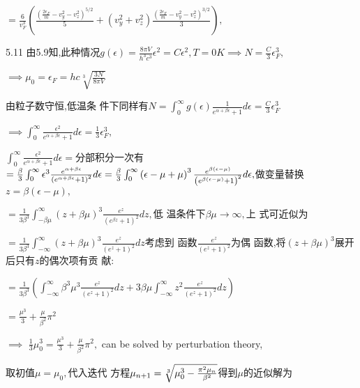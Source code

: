 \documentclass{ctexart}
\begin{document}
$=\frac{6}{v_{F}^{3}}\left( \frac{\left( \frac{2\epsilon _{F}}{m}%
-v_{y}^{2}-v_{z}^{2}\right) ^{5/2}}{5}+\left( v_{y}^{2}+v_{z}^{2}\right) 
\frac{\left( \frac{2\epsilon _{F}}{m}-v_{y}^{2}-v_{z}^{2}\right) ^{3/2}}{3}%
\right) ,$

5.11 由5.9知,此种情况$g\left( \epsilon
\right) =\frac{8\pi V}{h^{3}c^{3}}\epsilon ^{2}=C\epsilon ^{2},T=0K\implies
N=\frac{C}{3}\epsilon _{F}^{3},$

$\implies \mu _{0}=\epsilon _{F}=hc\sqrt[3]{\frac{3N}{8\pi V}}$

由粒子数守恒,低温条%
件下同样有$N=\int_{0}^{\infty }g\left(
\epsilon \right) \frac{1}{e^{\alpha +\beta \epsilon }+1}d\epsilon =\frac{C}{3%
}\epsilon _{F}^{3}$

$\implies \int_{0}^{\infty }\frac{\epsilon ^{2}}{e^{\alpha +\beta \epsilon
}+1}d\epsilon =\frac{1}{3}\epsilon _{F}^{3},$

$\int_{0}^{\infty }\frac{\epsilon ^{2}}{e^{\alpha +\beta \epsilon }+1}%
d\epsilon =$分部积分一次有$=\frac{%
\beta }{3}\int_{0}^{\infty }\epsilon ^{3}\frac{e^{\alpha +\beta \epsilon }}{%
\left( e^{\alpha +\beta \epsilon }+1\right) ^{2}}d\epsilon =\frac{\beta }{3}%
\int_{0}^{\infty }\left( \epsilon -\mu +\mu \right) ^{3}\frac{e^{\beta
\left( \epsilon -\mu \right) }}{\left( e^{\beta \left( \epsilon -\mu \right)
}+1\right) ^{2}}d\epsilon ,$做变量替换$z=\beta
\left( \epsilon -\mu \right) ,$

$=\frac{1}{3\beta ^{3}}\int_{-\beta \mu }^{\infty }\left( z+\beta \mu
\right) ^{3}\frac{e^{z}}{\left( e^{\beta z}+1\right) ^{2}}dz,$低%
温条件下$\beta \mu \rightarrow \infty ,$上%
式可近似为

$=\frac{1}{3\beta ^{3}}\int_{-\infty }^{\infty }\left( z+\beta \mu \right)
^{3}\frac{e^{z}}{\left( e^{z}+1\right) ^{2}}dz$考虑到%
函数$\frac{e^{z}}{\left( e^{z}+1\right) ^{2}}$为偶%
函数,将$\left( z+\beta \mu \right) ^{3}$展开%
后只有$z$的偶次项有贡%
献:

$=\frac{1}{3\beta ^{3}}\left( \int_{-\infty }^{\infty }\beta ^{3}\mu ^{3}%
\frac{e^{z}}{\left( e^{z}+1\right) ^{2}}dz+3\beta \mu \int_{-\infty
}^{\infty }z^{2}\frac{e^{z}}{\left( e^{z}+1\right) ^{2}}dz\right) $

$=\frac{\mu ^{3}}{3}+\frac{\mu }{\beta ^{2}}\pi ^{2}$

$\implies $ $\frac{1}{3}\mu _{0}^{3}=\frac{\mu ^{3}}{3}+\frac{\mu }{\beta
^{2}}\pi ^{2},$ can be solved by perturbation theory, 

取初值$\mu =\mu _{0},$代入迭代%
方程$\mu _{n+1}=\sqrt[3]{\mu _{0}^{3}-\frac{\pi ^{2}\mu _{n}}{%
\beta ^{2}}}$得到$\mu $的近似解为
\end{document}
